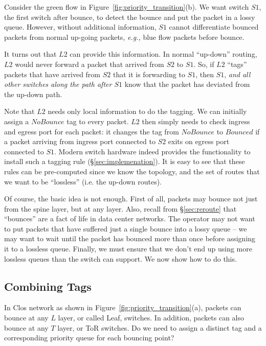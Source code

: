 Consider the green flow in Figure~\ref{fig:priority_transition}(b).  We want
switch $S1$, the first switch after bounce, to detect the bounce and put the
packet in a lossy queue. However, without additional information, $S1$ cannot
differentiate bounced packets from normal up-going packets, {\em e.g.,} blue
flow packets before bounce. 

It turns out that $L2$ can provide this information.  In normal ``up-down''
routing, $L2$ would never forward a packet that arrived from $S2$ to $S1$. So,
if $L2$ ``tags'' packets that have arrived from $S2$ that it is forwarding to $S1$,
then $S1$, {\em and all other switches along the path after $S1$} know that the
packet has deviated from the up-down path.

Note that $L2$ needs only local information to do the tagging. We can initially
assign a $NoBounce$ tag to every packet. $L2$ then simply needs to check ingress
and egress port for each packet: it changes the tag from $NoBounce$ to $Bounced$
if a packet arriving from ingress port connected to $S2$ exits on egress port
connected to $S1$.  Modern switch hardware indeed provides the functionality to
install such a tagging rule (\S\ref{sec:implemenation}).  It is easy to see that
these rules can be pre-computed since we know the topology, and the set of
routes that we want to be ``lossless'' (i.e. the up-down routes). 

Of course, the basic idea is not enough. First of all, packets may bounce not
just from the spine layer, but at any layer. Also, recall from
\S\ref{sec:reroute} that ``bounces'' are a fact of life in data center networks.
The operator may not want to put packets that have suffered just a single bounce
into a lossy queue -- we may want to wait until the packet has bounced more than
once before assigning it to a lossless queue. Finally, we must ensure that we don't
end up using more lossless queues than the switch can support. We now show how
to do this.

\subsection{Combining Tags}
\label{subsec:combine}

In Clos network as shown in Figure~\ref{fig:priority_transition}(a), packets can
bounce at any $L$ layer, or called Leaf, switches. In addition, packets can also
bounce at any $T$ layer, or ToR switches. Do we need to assign a distinct tag
and a corresponding priority queue for each bouncing point? 

